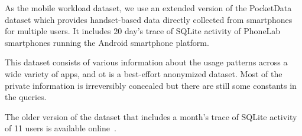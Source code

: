 As the mobile workload dataset, we use an extended version of the PocketData~\cite{kennedy2015pocket} dataset which provides handset-based data directly collected from smartphones for multiple users.
It includes
20 day's
trace of SQLite activity of
PhoneLab~\cite{phonelab} smartphones running the Android smartphone platform.

This dataset consists of various information about the usage patterns across a wide variety of apps, and ot is a best-effort anonymized dataset.
Most of the private information is irreversibly concealed but there are still some constants in the queries.

The older version of the dataset that includes a month's trace of SQLite activity of 11 users is available online~\cite{kennedy2015pocket}.





